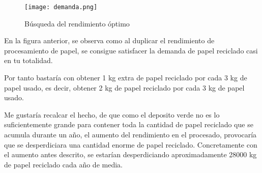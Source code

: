 \begin{figure}[H]
	\centering
	\texttt{[image: demanda.png]}
	\caption{Búsqueda del rendimiento óptimo}
\end{figure}

En la figura anterior, se observa como al duplicar el rendimiento de procesamiento de papel, se consigue satisfacer la demanda de papel reciclado casi en tu totalidad.

Por tanto bastaría con obtener 1 kg extra de papel reciclado por cada 3 kg de papel usado, es decir, obtener 2 kg de papel reciclado por cada 3 kg de papel usado.

Me gustaría recalcar el hecho, de que como el deposito verde no es lo suficientemente grande para contener toda la cantidad de papel reciclado que se acumula durante un año, el aumento del rendimiento en el procesado, provocaría que se desperdiciara una cantidad enorme de papel reciclado. Concretamente con el aumento antes descrito, se estarían desperdiciando aproximadamente 28000 kg de papel reciclado cada año de media.

